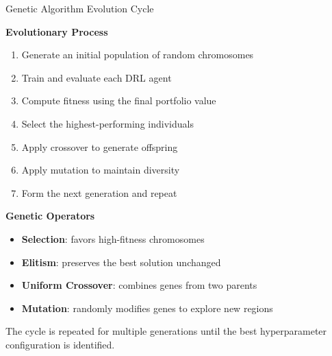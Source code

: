 \documentclass[10pt]{beamer}
\begin{document}
\begin{frame}{Genetic Algorithm Evolution Cycle}

\textbf{Evolutionary Process}

\begin{enumerate}
    \item Generate an initial population of random chromosomes
    \item Train and evaluate each DRL agent
    \item Compute fitness using the final portfolio value
    \item Select the highest-performing individuals
    \item Apply crossover to generate offspring
    \item Apply mutation to maintain diversity
    \item Form the next generation and repeat
\end{enumerate}

\vspace{0.4cm}

\textbf{Genetic Operators}

\begin{itemize}
    \item \textbf{Selection}: favors high-fitness chromosomes
    \item \textbf{Elitism}: preserves the best solution unchanged
    \item \textbf{Uniform Crossover}: combines genes from two parents
    \item \textbf{Mutation}: randomly modifies genes to explore new regions
\end{itemize}

\vspace{0.2cm}

The cycle is repeated for multiple generations until the best
hyperparameter configuration is identified.

\end{frame}
\end{document}
